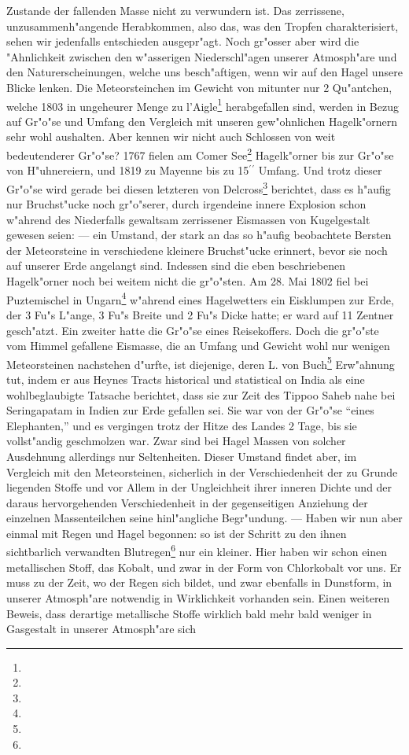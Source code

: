 \documentclass[a4paper, 8pt, oneside, polutonikogreek, german]{article}
\begin{document}
Zustande der fallenden Masse nicht zu verwundern ist. Das zerrissene, unzusammenh"angende Herabkommen, also das, was den Tropfen charakterisiert, sehen wir jedenfalls entschieden ausgepr"agt. Noch gr"osser aber wird die "Ahnlichkeit zwischen den w"asserigen Niederschl"agen unserer Atmosph"are und den Naturerscheinungen, welche uns besch"aftigen, wenn wir auf den Hagel unsere Blicke lenken. Die Meteorsteinchen im Gewicht von mitunter nur 2 Qu"antchen, welche 1803 in ungeheurer Menge zu l'Aigle\footnote{} herabgefallen sind, werden in Bezug auf Gr"o"se und Umfang den Vergleich mit unseren gew"ohnlichen Hagelk"ornern sehr wohl aushalten. Aber kennen wir nicht auch Schlossen von weit bedeutenderer Gr"o"se? 1767 fielen am Comer See\footnote{} Hagelk"orner bis zur Gr"o"se von H"uhnereiern, und 1819 zu Mayenne bis zu 15$^\prime$$^\prime$ Umfang. Und trotz dieser Gr"o"se wird gerade bei diesen letzteren von Delcross\footnote{} berichtet, dass es h"aufig nur Bruchst"ucke noch gr"o"serer, durch irgendeine innere Explosion schon w"ahrend des Niederfalls gewaltsam zerrissener Eismassen von Kugelgestalt gewesen seien: --- ein Umstand, der stark an das so h"aufig beobachtete Bersten der Meteorsteine in verschiedene kleinere Bruchst"ucke erinnert, bevor sie noch auf unserer Erde angelangt sind. Indessen sind die eben beschriebenen Hagelk"orner noch bei weitem nicht die gr"o"sten. Am 28. Mai 1802 fiel bei Puztemischel in Ungarn\footnote{} w"ahrend eines Hagelwetters ein Eisklumpen zur Erde, der 3 Fu"s L"ange, 3 Fu"s Breite und 2 Fu"s Dicke hatte; er ward auf 11 Zentner gesch"atzt. Ein zweiter hatte die Gr"o"se eines Reisekoffers. Doch die gr"o"ste vom Himmel gefallene Eismasse, die an Umfang und Gewicht wohl nur wenigen Meteorsteinen nachstehen d"urfte, ist diejenige, deren L. von Buch\footnote{} Erw"ahnung tut, indem er aus Heynes Tracts historical und statistical on India als eine wohlbeglaubigte Tatsache berichtet, dass sie zur Zeit des Tippoo Saheb nahe bei Seringapatam in Indien zur Erde gefallen sei. Sie war von der Gr"o"se "`eines Elephanten,"' und es vergingen trotz der Hitze des Landes 2 Tage, bis sie vollst"andig geschmolzen war. Zwar sind bei Hagel Massen von solcher Ausdehnung allerdings nur Seltenheiten. Dieser Umstand findet aber, im Vergleich mit den Meteorsteinen, sicherlich in der Verschiedenheit der zu Grunde liegenden Stoffe und vor Allem in der Ungleichheit ihrer inneren Dichte und der daraus hervorgehenden Verschiedenheit in der gegenseitigen Anziehung der einzelnen Massenteilchen seine hinl"angliche Begr"undung. --- Haben wir nun aber einmal mit Regen und Hagel begonnen: so ist der Schritt zu den ihnen sichtbarlich verwandten Blutregen\footnote{} nur ein kleiner. Hier haben wir schon einen metallischen Stoff, das Kobalt, und zwar in der Form von Chlorkobalt vor uns. Er muss zu der Zeit, wo der Regen sich bildet, und zwar ebenfalls in Dunstform, in unserer Atmosph"are notwendig in Wirklichkeit vorhanden sein. Einen weiteren Beweis, dass derartige metallische Stoffe wirklich bald mehr bald weniger in Gasgestalt in unserer Atmosph"are sich 
\end{document}
